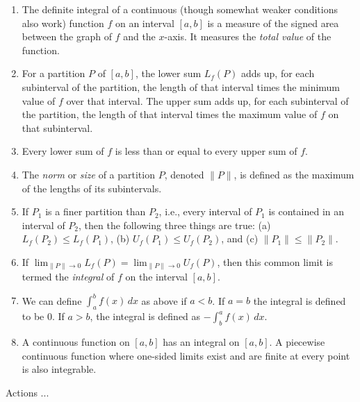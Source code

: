 \documentclass[10pt]{amsart}
\begin{document}
\begin{enumerate}
\item The definite integral of a continuous (though somewhat weaker
  conditions also work) function $f$ on an interval $[a,b]$ is a measure
  of the signed area between the graph of $f$ and the $x$-axis. It
  measures the {\em total value} of the function.
\item For a partition $P$ of $[a,b]$, the lower sum $L_f(P)$ adds up,
  for each subinterval of the partition, the length of that interval
  times the minimum value of $f$ over that interval. The upper sum
  adds up, for each subinterval of the partition, the length of that
  interval times the maximum value of $f$ on that subinterval.
\item Every lower sum of $f$ is less than or equal to every upper sum
  of $f$.
\item The {\em norm} or {\em size} of a partition $P$, denoted $\| P
  \|$, is defined as the maximum of the lengths of its
  subintervals.
\item If $P_1$ is a finer partition than $P_2$, i.e., every interval
  of $P_1$ is contained in an interval of $P_2$, then the following
  three things are true: (a) $L_f(P_2) \le L_f(P_1)$, (b) $U_f(P_1)
  \le U_f(P_2)$, and (c) $\| P_1 \| \le \| P_2 \|$.
\item If $\lim_{\| P \| \to 0} L_f(P) = \lim_{\| P \| \to 0} U_f(P)$,
  then this common limit is termed the {\em integral} of $f$ on the
  interval $[a,b]$.
\item We can define $\int_a^b f(x) \, dx$ as above if $a < b$. If $a =
  b$ the integral is defined to be $0$. If $a > b$, the integral is
  defined as $-\int_b^a f(x) \, dx$.
\item A continuous function on $[a,b]$ has an integral on $[a,b]$. A
  piecewise continuous function where one-sided limits exist and are
  finite at every point is also integrable.
\end{enumerate}

Actions ...
\end{document}
